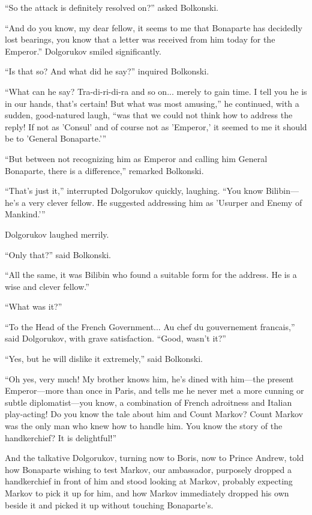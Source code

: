 ``So the attack is definitely resolved on?'' asked Bolkonski.

``And do you know, my dear fellow, it seems to me that Bonaparte
has decidedly lost bearings, you know that a letter was received
from him today for the Emperor.'' Dolgorukov smiled
significantly.

``Is that so? And what did he say?'' inquired Bolkonski.

``What can he say? Tra-di-ri-di-ra and so on... merely to gain
time. I tell you he is in our hands, that's certain! But what was
most amusing,'' he continued, with a sudden, good-natured laugh,
``was that we could not think how to address the reply! If not as
'Consul' and of course not as 'Emperor,' it seemed to me it
should be to 'General Bonaparte.'{}''

``But between not recognizing him as Emperor and calling him
General Bonaparte, there is a difference,'' remarked Bolkonski.

``That's just it,'' interrupted Dolgorukov quickly,
laughing. ``You know Bilibin---he's a very clever fellow. He
suggested addressing him as 'Usurper and Enemy of Mankind.'{}''

Dolgorukov laughed merrily.

``Only that?'' said Bolkonski.

``All the same, it was Bilibin who found a suitable form for the
address.  He is a wise and clever fellow.''

``What was it?''

``To the Head of the French Government... Au chef du gouvernement
francais,'' said Dolgorukov, with grave satisfaction. ``Good,
wasn't it?''

``Yes, but he will dislike it extremely,'' said Bolkonski.

``Oh yes, very much! My brother knows him, he's dined with
him---the present Emperor---more than once in Paris, and tells me
he never met a more cunning or subtle diplomatist---you know, a
combination of French adroitness and Italian play-acting! Do you
know the tale about him and Count Markov? Count Markov was the
only man who knew how to handle him.  You know the story of the
handkerchief? It is delightful!''

And the talkative Dolgorukov, turning now to Boris, now to Prince
Andrew, told how Bonaparte wishing to test Markov, our
ambassador, purposely dropped a handkerchief in front of him and
stood looking at Markov, probably expecting Markov to pick it up
for him, and how Markov immediately dropped his own beside it and
picked it up without touching Bonaparte's.

